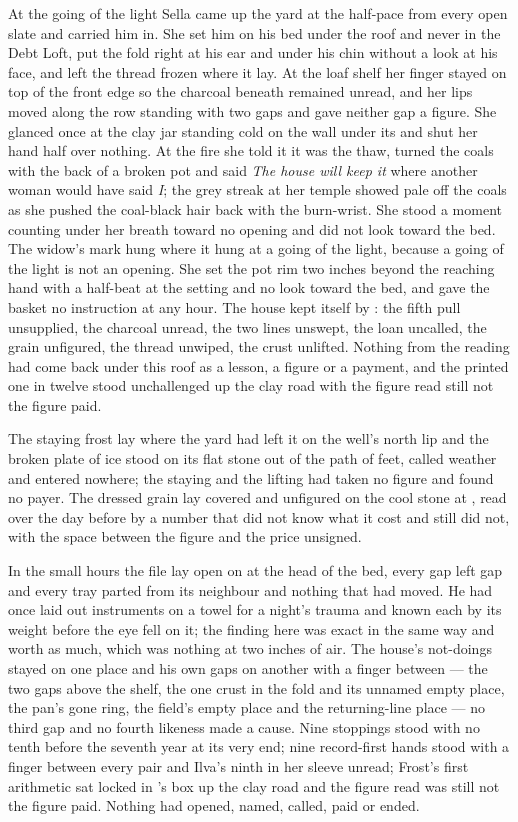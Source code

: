 At the going of the light Sella came up the yard at the half-pace from every open slate and carried him in. She set him on his bed under the roof and never in the Debt Loft, put the fold right at his ear and under his chin without a look at his face, and left the thread frozen where it lay. At the loaf shelf her finger stayed on top of the front edge so the charcoal beneath remained unread, and her lips moved along the row standing with two gaps and gave neither gap a figure. She glanced once at the clay jar standing cold on the wall under its  and shut her hand half over nothing. At the fire she told it it was the thaw, turned the coals with the back of a broken pot and said \emph{The house will keep it} where another woman would have said \emph{I}; the grey streak at her temple showed pale off the coals as she pushed the coal-black hair back with the burn-wrist. She stood a moment counting under her breath toward no opening and did not look toward the bed. The widow's mark hung where it hung at a going of the light, because a going of the light is not an opening. She set the pot rim two inches beyond the reaching hand with a half-beat at the setting and no look toward the bed, and gave the basket no instruction at any hour. The house kept itself by : the fifth pull unsupplied, the charcoal unread, the two lines unswept, the loan uncalled, the grain unfigured, the thread unwiped, the crust unlifted. Nothing from the reading had come back under this roof as a lesson, a figure or a payment, and the printed one in twelve stood unchallenged up the clay road with the figure read still not the figure paid.

The staying frost lay where the yard had left it on the well's north lip and the broken plate of ice stood on its flat stone out of the path of feet, called weather and entered nowhere; the staying and the lifting had taken no figure and found no payer. The dressed grain lay covered and unfigured on the cool stone at , read over the day before by a number that did not know what it cost and still did not, with the space between the figure and the price unsigned.

In the small hours the file lay open on  at the head of the bed, every gap left gap and every tray parted from its neighbour and nothing that had moved. He had once laid out instruments on a towel for a night's trauma and known each by its weight before the eye fell on it; the finding here was exact in the same way and worth as much, which was nothing at two inches of air. The house's not-doings stayed on one place and his own gaps on another with a finger between --- the two gaps above the shelf, the one crust in the fold and its unnamed empty place, the pan's gone ring, the field's empty place and the returning-line place --- no third gap and no fourth likeness made a cause. Nine stoppings stood with no tenth before the seventh year at its very end; nine record-first hands stood with a finger between every pair and Ilva's ninth in her sleeve unread; Frost's first arithmetic sat locked in 's box up the clay road and the figure read was still not the figure paid. Nothing had opened, named, called, paid or ended.

